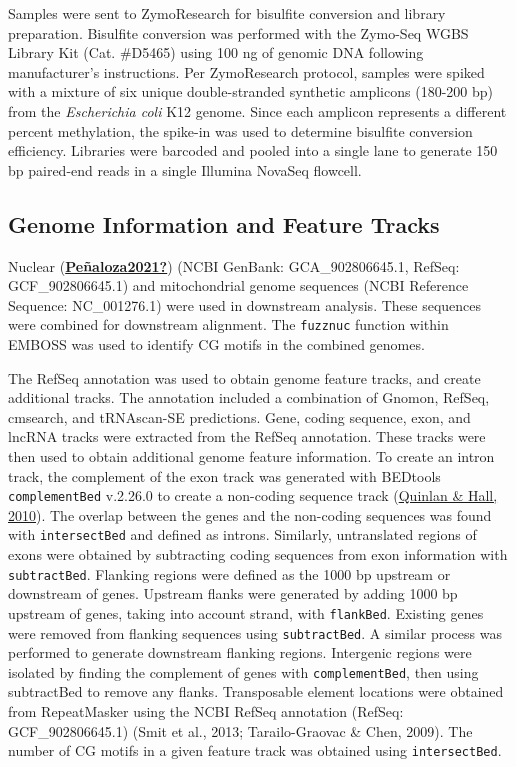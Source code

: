 \documentclass [11pt, proquest] {uwthesis}[2015/03/03]
\begin{document}
Samples were sent to ZymoResearch for bisulfite conversion and library preparation. Bisulfite conversion was performed with the Zymo-Seq WGBS Library Kit (Cat. \#D5465) using 100 ng of genomic DNA following manufacturer's instructions. Per ZymoResearch protocol, samples were spiked with a mixture of six unique double-stranded synthetic amplicons (180-200 bp) from the \emph{Escherichia coli} K12 genome. Since each amplicon represents a different percent methylation, the spike-in was used to determine bisulfite conversion efficiency. Libraries were barcoded and pooled into a single lane to generate 150 bp paired-end reads in a single Illumina NovaSeq flowcell.

\hypertarget{genome-information-and-feature-tracks}{%
\subsection{Genome Information and Feature Tracks}\label{genome-information-and-feature-tracks}}

Nuclear (\protect\hyperlink{ref-Peuxf1aloza2021}{\textbf{Peñaloza2021?}}) (NCBI GenBank: GCA\_902806645.1, RefSeq: GCF\_902806645.1) and mitochondrial genome sequences (NCBI Reference Sequence: NC\_001276.1) were used in downstream analysis. These sequences were combined for downstream alignment. The \texttt{fuzznuc} function within EMBOSS was used to identify CG motifs in the combined genomes.

The RefSeq annotation was used to obtain genome feature tracks, and create additional tracks. The annotation included a combination of Gnomon, RefSeq, cmsearch, and tRNAscan-SE predictions. Gene, coding sequence, exon, and lncRNA tracks were extracted from the RefSeq annotation. These tracks were then used to obtain additional genome feature information. To create an intron track, the complement of the exon track was generated with BEDtools \texttt{complementBed} v.2.26.0 to create a non-coding sequence track (\protect\hyperlink{ref-Quinlan2010}{Quinlan \& Hall, 2010}). The overlap between the genes and the non-coding sequences was found with \texttt{intersectBed} and defined as introns. Similarly, untranslated regions of exons were obtained by subtracting coding sequences from exon information with \texttt{subtractBed}. Flanking regions were defined as the 1000 bp upstream or downstream of genes. Upstream flanks were generated by adding 1000 bp upstream of genes, taking into account strand, with \texttt{flankBed}. Existing genes were removed from flanking sequences using \texttt{subtractBed}. A similar process was performed to generate downstream flanking regions. Intergenic regions were isolated by finding the complement of genes with \texttt{complementBed}, then using subtractBed to remove any flanks. Transposable element locations were obtained from RepeatMasker using the NCBI RefSeq annotation (RefSeq: GCF\_902806645.1) (Smit et al., 2013; Tarailo-Graovac \& Chen, 2009). The number of CG motifs in a given feature track was obtained using \texttt{intersectBed}.
\end{document}
